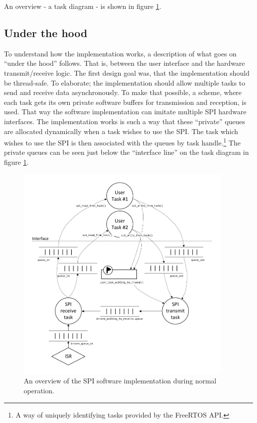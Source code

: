 An overview - a task diagram - is shown in figure \ref{fig:spi_task_diagram}.



\subsection{Under the hood}\label{sec:spi_underthehood}
To understand how the implementation works, a description of what goes on ``under the hood'' follows. That is, between the user interface and the hardware transmit/receive logic. The first design goal was, that the implementation should be thread-safe. To elaborate; the implementation should allow multiple tasks to send and receive data asynchronously. To make that possible, a scheme, where each task gets its own private software buffers for transmission and reception, is used. That way the software implementation can imitate multiple SPI hardware interfaces. The implementation works is such a way that these ``private'' queues are allocated dynamically when a task wishes to use the SPI. The task which wishes to use the SPI is then associated with the queues by task handle.\footnote{A way of uniquely identifying tasks provided by the FreeRTOS API.} The private queues can be seen just below the ``interface line'' on the task diagram in figure \ref{fig:spi_task_diagram}.

\begin{figure}[htb]
  \centering
  \includegraphics[width=0.94\textwidth,clip,trim=0 15 0 15]{content/04_communication/figures/spi_task_diagram_running.pdf}
  \caption{An overview of the SPI software implementation during normal operation.}
  \label{fig:spi_task_diagram}
\end{figure}%


